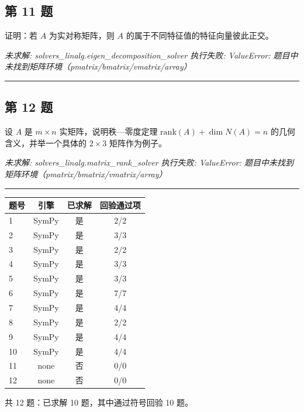 \documentclass[12pt, a4paper]{article}
\newcommand{\problem}[1]{\subsection*{第 #1 题}}
\begin{document}
\problem{11}

证明：若 $A$ 为实对称矩阵，则 $A$ 的属于不同特征值的特征向量彼此正交。

\textit{\color{warnred} 未求解: solvers\_linalg.eigen\_decomposition\_solver 执行失败: ValueError: 题目中未找到矩阵环境（pmatrix/bmatrix/vmatrix/array）}

\vspace{0.8em}
\hrule
\vspace{0.8em}

\problem{12}

设 $A$ 是 $m \times n$ 实矩阵，说明秩—零度定理 $\mathrm{rank}(A) + \dim N(A) = n$ 的几何含义，并举一个具体的 $2 \times 3$ 矩阵作为例子。

\textit{\color{warnred} 未求解: solvers\_linalg.matrix\_rank\_solver 执行失败: ValueError: 题目中未找到矩阵环境（pmatrix/bmatrix/vmatrix/array）}

\vspace{0.8em}
\hrule
\vspace{0.8em}

\begin{center}
\begin{tabular}{@{}lccc@{}}
\toprule
题号 & 引擎 & 已求解 & 回验通过项 \\
\midrule
    1 & SymPy & 是 & 2/2 \\
    2 & SymPy & 是 & 3/3 \\
    3 & SymPy & 是 & 2/2 \\
    4 & SymPy & 是 & 3/3 \\
    5 & SymPy & 是 & 3/3 \\
    6 & SymPy & 是 & 7/7 \\
    7 & SymPy & 是 & 4/4 \\
    8 & SymPy & 是 & 2/2 \\
    9 & SymPy & 是 & 4/4 \\
    10 & SymPy & 是 & 4/4 \\
    11 & none & 否 & 0/0 \\
    12 & none & 否 & 0/0 \\
\bottomrule
\end{tabular}
\end{center}

\noindent 共 12 题：已求解 10 题，其中通过符号回验 10 题。
\end{document}
